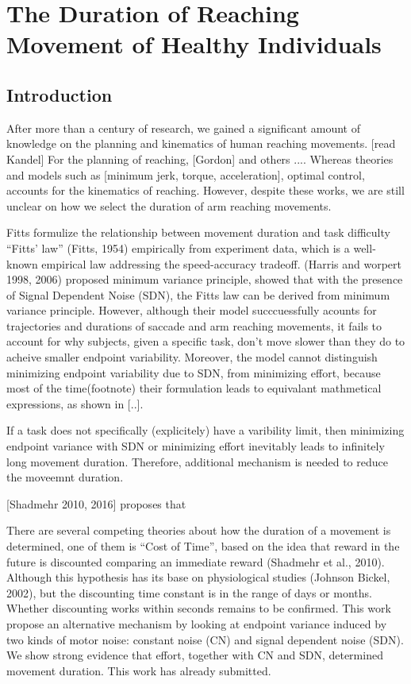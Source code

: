 \chapter{The Duration of Reaching Movement of Healthy Individuals}
\label{cha:ocmd}

\section{Introduction}
After more than a century of research, we gained a significant amount of knowledge on the planning and kinematics of human reaching movements. [read Kandel] For the planning of reaching, [Gordon] and others .... Whereas theories and models such as [minimum jerk, torque, acceleration], optimal control, accounts for the kinematics of reaching. However, despite these works, we are still unclear on how we select the duration of arm reaching movements. 

Fitts formulize the relationship between movement duration and task difficulty  “Fitts’ law” (Fitts, 1954) empirically from experiment data, which is a well-known empirical law addressing the speed-accuracy tradeoff. (Harris and worpert 1998, 2006) proposed minimum variance principle, showed that with the presence of Signal Dependent Noise (SDN), the Fitts law can be derived from minimum variance principle. However, although their model succcuessfully acounts for trajectories and durations of saccade and arm reaching movements, it fails to account for why subjects, given a specific task, don't move slower than they do to acheive smaller endpoint variability. Moreover, the model cannot distinguish minimizing endpoint variability due to SDN, from minimizing effort, because most of the time(footnote) their formulation leads to equivalant mathmetical expressions, as shown in [..]. 

If a task does not specifically (explicitely) have a varibility limit, then minimizing endpoint variance with SDN or minimizing effort inevitably leads to infinitely long movement duration. Therefore, additional mechanism is needed to reduce the moveemnt duration.

[Shadmehr 2010, 2016] proposes that 

There are several competing theories about how the duration of a movement is determined, one of them is “Cost of Time”, based on the idea that reward in the future is discounted comparing an immediate reward (Shadmehr et al., 2010). Although this hypothesis has its base on physiological studies (Johnson  Bickel, 2002), but the discounting time constant is in the range of days or months. Whether discounting works within seconds remains to be confirmed. This work propose an alternative mechanism by looking at endpoint variance induced by two kinds of motor noise: constant noise (CN) and signal dependent noise (SDN). We show strong evidence that effort, together with CN and SDN, determined movement duration. This work has already submitted.



